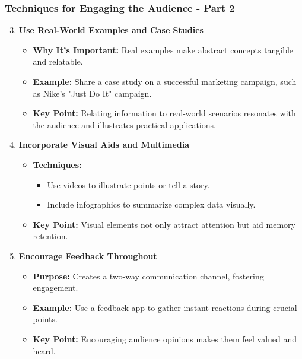 \documentclass[aspectratio=169]{beamer}
\begin{document}
\begin{frame}[fragile]
    \frametitle{Techniques for Engaging the Audience - Part 2}

    \begin{enumerate}
        \setcounter{enumi}{2}
        \item \textbf{Use Real-World Examples and Case Studies}
        \begin{itemize}
            \item \textbf{Why It's Important:} Real examples make abstract concepts tangible and relatable.
            \item \textbf{Example:} Share a case study on a successful marketing campaign, such as Nike's "Just Do It" campaign.
            \item \textbf{Key Point:} Relating information to real-world scenarios resonates with the audience and illustrates practical applications.
        \end{itemize}

        \item \textbf{Incorporate Visual Aids and Multimedia}
        \begin{itemize}
            \item \textbf{Techniques:}
            \begin{itemize}
                \item Use videos to illustrate points or tell a story.
                \item Include infographics to summarize complex data visually.
            \end{itemize}
            \item \textbf{Key Point:} Visual elements not only attract attention but aid memory retention.
        \end{itemize}

        \item \textbf{Encourage Feedback Throughout}
        \begin{itemize}
            \item \textbf{Purpose:} Creates a two-way communication channel, fostering engagement.
            \item \textbf{Example:} Use a feedback app to gather instant reactions during crucial points.
            \item \textbf{Key Point:} Encouraging audience opinions makes them feel valued and heard.
        \end{itemize}
    \end{enumerate}
\end{frame}
\end{document}
